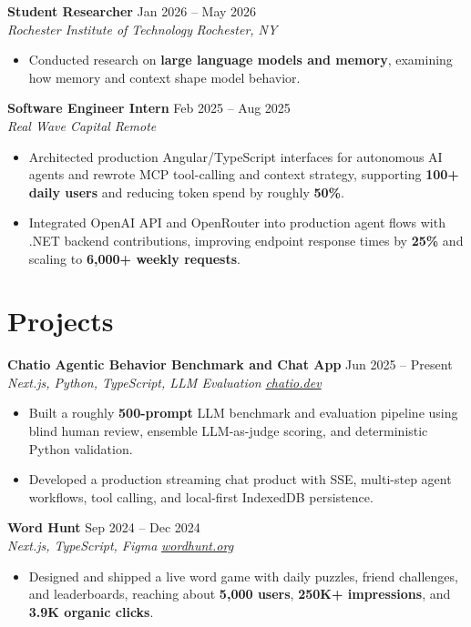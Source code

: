 \documentclass[10pt,letterpaper]{article}
\newif\ifresumeFirstRole
\newcommand{\resumeRole}[4]{%
  \ifresumeFirstRole
    \global\resumeFirstRolefalse
  \else
    \vspace{0pt plus 1fill}%
  \fi
  \textbf{#1} \hfill #2\\
  \textit{#3} \hfill \textit{#4}
}
\begin{document}
\resumeRole{Student Researcher}{Jan 2026 -- May 2026}{Rochester Institute of Technology}{Rochester, NY}
\begin{itemize}
  \item Conducted research on \textbf{large language models and memory}, examining how memory and context shape model behavior.
\end{itemize}

\resumeRole{Software Engineer Intern}{Feb 2025 -- Aug 2025}{Real Wave Capital}{Remote}
\begin{itemize}
  \item Architected production Angular/TypeScript interfaces for autonomous AI agents and rewrote MCP tool-calling and context strategy, supporting \textbf{100+ daily users} and reducing token spend by roughly \textbf{50\%}.
  \item Integrated OpenAI API and OpenRouter into production agent flows with .NET backend contributions, improving endpoint response times by \textbf{25\%} and scaling to \textbf{6,000+ weekly requests}.
\end{itemize}

\section*{Projects}
\resumeRole{Chatio Agentic Behavior Benchmark and Chat App}{Jun 2025 -- Present}{Next.js, Python, TypeScript, LLM Evaluation}{\href{https://chatio.dev}{chatio.dev}}
\begin{itemize}
  \item Built a roughly \textbf{500-prompt} LLM benchmark and evaluation pipeline using blind human review, ensemble LLM-as-judge scoring, and deterministic Python validation.
  \item Developed a production streaming chat product with SSE, multi-step agent workflows, tool calling, and local-first IndexedDB persistence.
\end{itemize}

\resumeRole{Word Hunt}{Sep 2024 -- Dec 2024}{Next.js, TypeScript, Figma}{\href{https://wordhunt.org}{wordhunt.org}}
\begin{itemize}
  \item Designed and shipped a live word game with daily puzzles, friend challenges, and leaderboards, reaching about \textbf{5,000 users}, \textbf{250K+ impressions}, and \textbf{3.9K organic clicks}.
\end{itemize}
\end{document}
